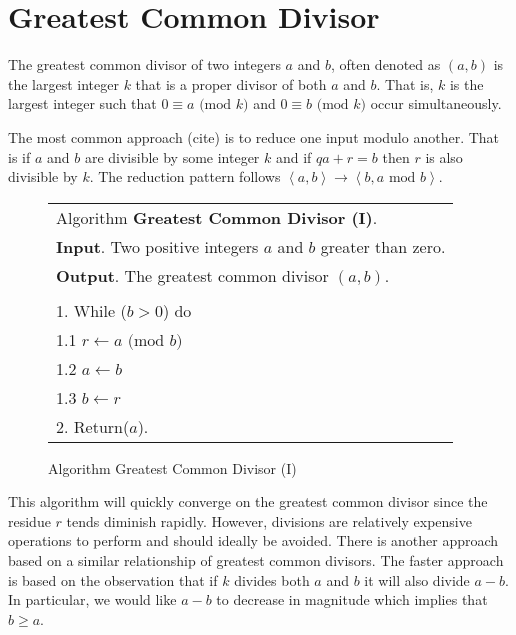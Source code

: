 \documentclass[b5paper]{book}
\begin{document}
\section{Greatest Common Divisor}
The greatest common divisor of two integers $a$ and $b$, often denoted as $(a, b)$ is the largest integer $k$ that is a proper divisor of
both $a$ and $b$.  That is, $k$ is the largest integer such that $0 \equiv a \mbox{ (mod }k\mbox{)}$ and $0 \equiv b \mbox{ (mod }k\mbox{)}$ occur
simultaneously.

The most common approach (cite) is to reduce one input modulo another.  That is if $a$ and $b$ are divisible by some integer $k$ and if $qa + r = b$ then
$r$ is also divisible by $k$.  The reduction pattern follows $\left < a , b \right > \rightarrow \left < b, a \mbox{ mod } b \right >$.  

\newpage\begin{figure}[!here]
\begin{small}
\begin{center}
\begin{tabular}{l}
\hline Algorithm \textbf{Greatest Common Divisor (I)}. \\
\textbf{Input}.   Two positive integers $a$ and $b$ greater than zero. \\
\textbf{Output}.  The greatest common divisor $(a, b)$.  \\
\hline \\
1.  While ($b > 0$) do \\
\hspace{3mm}1.1  $r \leftarrow a \mbox{ (mod }b\mbox{)}$ \\
\hspace{3mm}1.2  $a \leftarrow b$ \\
\hspace{3mm}1.3  $b \leftarrow r$ \\
2.  Return($a$). \\
\hline
\end{tabular}
\end{center}
\end{small}
\caption{Algorithm Greatest Common Divisor (I)}
\label{fig:gcd1}
\end{figure}

This algorithm will quickly converge on the greatest common divisor since the residue $r$ tends diminish rapidly.  However, divisions are
relatively expensive operations to perform and should ideally be avoided.  There is another approach based on a similar relationship of 
greatest common divisors.  The faster approach is based on the observation that if $k$ divides both $a$ and $b$ it will also divide $a - b$.  
In particular, we would like $a - b$ to decrease in magnitude which implies that $b \ge a$.  
\end{document}
